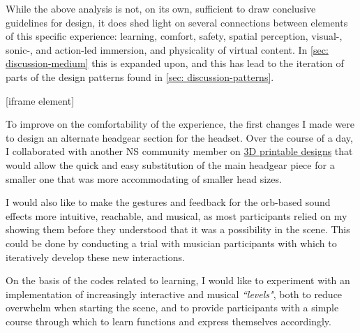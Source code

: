 While the above analysis is not, on its own, sufficient to draw conclusive guidelines for design, it does shed light on several connections between elements of this specific experience: learning, comfort, safety, spatial perception, visual-, sonic-, and action-led immersion, and physicality of virtual content. In \autoref{sec: discussion-medium} this is expanded upon, and this has lead to the iteration of parts of the design patterns found in \autoref{sec: discussion-patterns}.

[iframe element]

To improve on the comfortability of the experience, the first changes I made were to design an alternate headgear section for the headset. Over the course of a day, I collaborated with another NS community member on \href{https://github.com/AheadIO/Deck-X/tree/main/Deck_X/STL_files/Headgear/Welding_Headgear_Adaptor}{3D printable designs} that would allow the quick and easy substitution of the main headgear piece for a smaller one that was more accommodating of smaller head sizes.

I would also like to make the gestures and feedback for the orb-based sound effects more intuitive, reachable, and musical, as most participants relied on my showing them before they understood that it was a possibility in the scene. This could be done by conducting a trial with musician participants with which to iteratively develop these new interactions. 

On the basis of the codes related to learning, I would like to experiment with an implementation of increasingly interactive and musical \textit{``levels"}, both to reduce overwhelm when starting the scene, and to provide participants with a simple course through which to learn functions and express themselves accordingly.